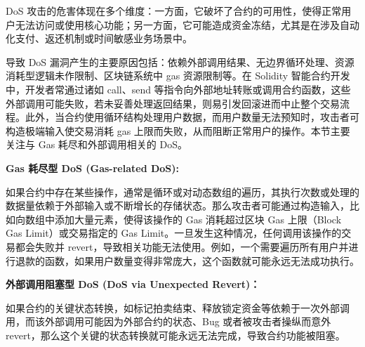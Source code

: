 \documentclass[print, master, vlined, timesmath]{DissertUESTC}
\begin{document}
DoS 攻击的危害体现在多个维度：一方面，它破坏了合约的可用性，使得正常用户无法访问或使用核心功能；另一方面，它可能造成资金冻结，尤其是在涉及自动化支付、返还机制或时间敏感业务场景中。

导致 DoS 漏洞产生的主要原因包括：依赖外部调用结果、无边界循环处理、资源消耗型逻辑未作限制、区块链系统中 gas 资源限制等。在 Solidity 智能合约开发中，开发者常通过诸如 call、send 等指令向外部地址转账或调用合约函数，这些外部调用可能失败，若未妥善处理返回结果，则易引发回滚进而中止整个交易流程。此外，当合约使用循环结构处理用户数据，而用户数量无法预知时，攻击者可构造极端输入使交易消耗 gas 上限而失败，从而阻断正常用户的操作。本节主要关注与 Gas 耗尽和外部调用相关的 DoS。


\textbf{Gas 耗尽型 DoS (Gas-related DoS):}

如果合约中存在某些操作，通常是循环或对动态数组的遍历，其执行次数或处理的数据量依赖于外部输入或不断增长的存储状态。那么攻击者可能通过构造输入，比如向数组中添加大量元素，使得该操作的 Gas 消耗超过区块 Gas 上限（Block Gas Limit）或交易指定的 Gas Limit。一旦发生这种情况，任何调用该操作的交易都会失败并 revert，导致相关功能无法使用。例如，一个需要遍历所有用户并进行退款的函数，如果用户数量变得非常庞大，这个函数就可能永远无法成功执行。

\textbf{外部调用阻塞型 DoS (DoS via Unexpected Revert)：}

如果合约的关键状态转换，如标记拍卖结束、释放锁定资金等依赖于一次外部调用，而该外部调用可能因为外部合约的状态、Bug 或者被攻击者操纵而意外 revert，那么这个关键的状态转换就可能永远无法完成，导致合约功能被阻塞。

\end{document}
